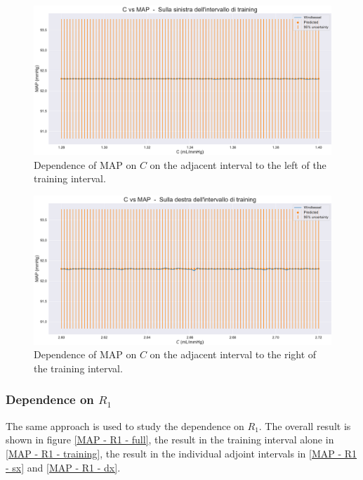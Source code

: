 \begin{figure}
    \centering
    \includegraphics[width=1\textwidth]{images/Training (risultati)/MAP/MAP - C - sx.pdf}
    \caption{Dependence of MAP on $C$ on the adjacent interval to the left of the training interval.}
    \label{MAP - C - sx}
\end{figure}



\begin{figure}
    \centering
    \includegraphics[width=1\textwidth]{images/Training (risultati)/MAP/MAP - C - dx.pdf}
    \caption{Dependence of MAP on $C$ on the adjacent interval to the right of the training interval.}
    \label{MAP - C - dx}
\end{figure}




\newpage
\subsubsection{Dependence on $R_1$}
The same approach is used to study the dependence on $R_1$. The overall result is shown in figure \ref{MAP - R1 - full}, the result in the training interval alone in \ref{MAP - R1 - training}, the result in the individual adjoint intervals in \ref{MAP - R1 - sx} and \ref{MAP - R1 - dx}.

